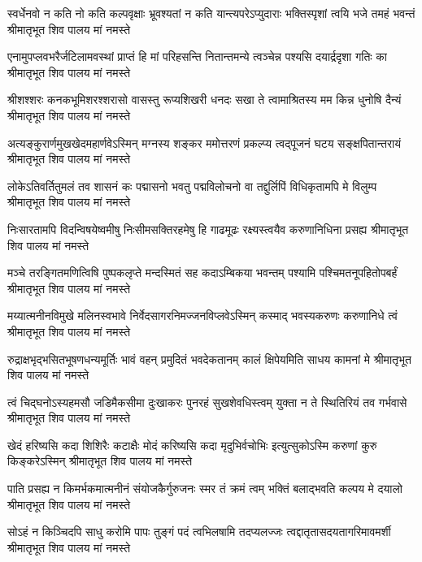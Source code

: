 \fourlineindentedshloka
{स्वर्धेनवो न कति नो कति कल्पवृक्षाः}
{भ्रूवश्यतां न कति यान्त्यपरेऽप्युदाराः}
{भक्तिस्पृशां त्वयि भजे तमहं भवन्तं}
{श्रीमातृभूत शिव पालय मां नमस्ते} %

\fourlineindentedshloka
{एनामुपप्लवभरैर्जटिलामवस्थां}
{प्राप्तं हि मां परिहसन्ति नितान्तमन्ये}
{त्वञ्चेन्न पश्यसि दयार्द्रदृशा गतिः का}
{श्रीमातृभूत शिव पालय मां नमस्ते} %

\fourlineindentedshloka
{श्रीशश्शरः कनकभूमिशरश्शरासो}
{वासस्तु रूप्यशिखरी धनदः सखा ते}
{त्वामाश्रितस्य मम किन्न धुनोषि दैन्यं}
{श्रीमातृभूत शिव पालय मां नमस्ते} %

\fourlineindentedshloka
{अत्यङ्कुरार्णमुखखेदमहार्णवेऽस्मिन्}
{मग्नस्य शङ्कर ममोत्तरणं प्रकल्प्य}
{त्वद्पूजनं घटय सङ्क्षपितान्तरायं}
{श्रीमातृभूत शिव पालय मां नमस्ते} %

\fourlineindentedshloka
{लोकेऽतिवर्तितुमलं तव शासनं कः}
{पद्मासनो भवतु पद्मविलोचनो वा}
{तद्दुर्लिपिं विधिकृतामपि मे विलुम्प}
{श्रीमातृभूत शिव पालय मां नमस्ते} %

\fourlineindentedshloka
{निःसारतामपि विदन्विषयेष्वमीषु}
{निःसीमसक्तिरहमेषु हि गाढमूढः}
{रक्ष्यस्त्वयैव करुणानिधिना प्रसह्य}
{श्रीमातृभूत शिव पालय मां नमस्ते} %

\fourlineindentedshloka
{मञ्चे तरङ्गितमणित्विषि पुष्पकलृप्ते}
{मन्दस्मितं सह कदाऽम्बिकया भवन्तम्}
{पश्यामि पश्चिमतनूपहितोपबर्हं}
{श्रीमातृभूत शिव पालय मां नमस्ते} %

\fourlineindentedshloka
{मय्यात्मनीनविमुखे मलिनस्वभावे}
{निर्वेदसागरनिमज्जनविप्लवेऽस्मिन्}
{कस्माद् भवस्यकरुणः करुणानिधे त्वं}
{श्रीमातृभूत शिव पालय मां नमस्ते} %

\fourlineindentedshloka
{रुद्राक्षभृद्भसितभूषणधन्यमूर्तिः}
{भावं वहन् प्रमुदितं भवदेकतानम्}
{कालं क्षिपेयमिति साधय कामनां मे}
{श्रीमातृभूत शिव पालय मां नमस्ते} %

\fourlineindentedshloka
{त्वं चिद्घनोऽस्यहमसौ जडिमैकसीमा}
{दुःखाकरः पुनरहं सुखशेवधिस्त्वम्}
{युक्ता न ते स्थितिरियं तव गर्भवासे}
{श्रीमातृभूत शिव पालय मां नमस्ते} %

\fourlineindentedshloka
{खेदं हरिष्यसि कदा शिशिरैः कटाक्षैः}
{मोदं करिष्यसि कदा मृदुभिर्वचोभिः}
{ इत्युत्सुकोऽस्मि करुणां कुरु किङ्करेऽस्मिन्}
{श्रीमातृभूत शिव पालय मां नमस्ते} %

\fourlineindentedshloka
{पाति प्रसह्य न किमर्भकमात्मनीनं}
{संयोजकैर्गुरुजनः स्मर तं क्रमं त्वम्}
{भक्तिं बलाद्भवति कल्पय मे दयालो}
{श्रीमातृभूत शिव पालय मां नमस्ते} %

\fourlineindentedshloka
{सोऽहं न किञ्चिदपि साधु करोमि पापः}
{तुङ्गं पदं त्वभिलषामि तदप्यलज्जः}
{त्वद्दातृतासदयतागरिमावमर्शी}
{श्रीमातृभूत शिव पालय मां नमस्ते} %

